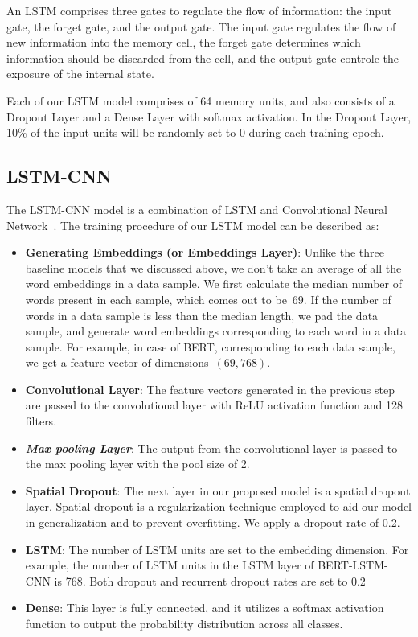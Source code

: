 \documentclass[conference]{IEEEtran}
\begin{document}
An LSTM comprises three gates to regulate the flow of information: the input gate, the forget gate, and the output gate. The input gate regulates the flow of new information into the memory cell, the forget gate determines which information should be discarded from the cell, and the output gate controle the exposure of the internal state. 

Each of our LSTM model comprises of 64 memory units, and also consists of a Dropout Layer and a Dense Layer with softmax activation. In the Dropout Layer, 10\% of the input units will be randomly set to 0 during each training epoch.

\subsection{LSTM-CNN}
The LSTM-CNN model is a combination of LSTM and Convolutional Neural Network~\cite{cnn}. The training procedure of our LSTM model can be described as:
\begin{itemize}
    \item \textbf{Generating Embeddings (or Embeddings Layer)}: Unlike the three baseline models that we discussed above, we don't take an average of all the word embeddings in a data sample. We first calculate the median number of words present in each sample, which comes out to be~$69$. If the number of words in a data sample is less than the median length, we pad the data sample, and generate word embeddings corresponding to each word in a data sample. For example, in case of BERT, corresponding to each data sample, we get a feature vector of dimensions~$(69, 768)$.
    \item \textbf{Convolutional Layer}: The feature vectors generated in the previous step are passed to the convolutional layer with ReLU activation function and 128 filters.
    \item \textbf{\textit{Max pooling Layer}}: The output from the convolutional layer is passed to the max pooling layer with the pool size of 2.
    \item \textbf{Spatial Dropout}: The next layer in our proposed model is a spatial dropout layer. Spatial dropout is a regularization technique employed to aid our model in generalization and to prevent overfitting. We apply a dropout rate of 0.2.
    \item \textbf{LSTM}: The number of LSTM units are set to the embedding dimension. For example, the number of LSTM units in the LSTM layer of BERT-LSTM-CNN is 768. Both dropout and recurrent dropout rates are set to 0.2
    \item \textbf{Dense}: This layer is fully connected, and it utilizes a softmax activation function to output the probability distribution across all classes.
\end{itemize}
\end{document}

